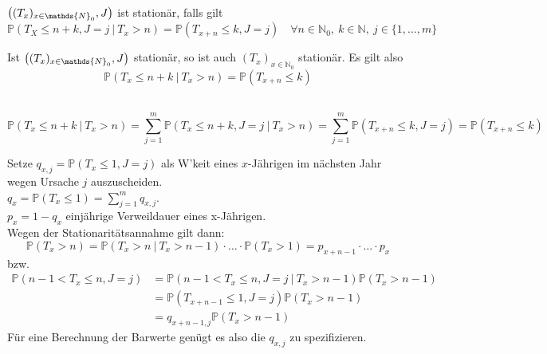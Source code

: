 $\enbrace{(T_x)_{x\in \mathds{N}_0},J}$ ist stationär, falls gilt 
\[ 
\mathds{P}(T_X\le n+k,J=j~|~T_x>n)=\mathds{P}(T_{x+n}\le k,J=j)\quad \forall n\in \mathds{N}_0,~k\in \mathds{N},~j\in \{1,\dots,m\} 
\]

Ist $\enbrace{(T_x)_{x\in \mathds{N}_0},J}$ stationär, so ist auch $(T_x)_{x\in \mathds{N}_0}$ stationär. Es gilt also 
\[ 
\mathds{P}(T_x\le n+k~|~T_x>n)=\mathds{P}(T_{x+n}\le k) 
\]

\\
\[ 
\mathds{P}(T_x\le n+k~|~T_x>n)= \sum_{j=1}^{m}\mathds{P}(T_x\le n+k,J=j~|~T_x>n)= \sum_{j=1}^{m}\mathds{P}(T_{x+n}\le k,J=j)= \mathds{P}(T_{x+n}\le k) 
\]

Setze $q_{x,j}=\mathds{P}(T_x\le 1,J=j)$ als W'keit eines $x$-Jährigen im nächsten Jahr wegen Ursache $j$ auszuscheiden.\\
$q_x=\mathds{P}(T_x\le 1)=\sum_{j=1}^{m}q_{x,j}$.\\
$p_x=1-q_x$ einjährige Verweildauer eines x-Jährigen.\\
Wegen der Stationaritätsannahme gilt dann: \[ \mathds{P}(T_x>n)=\mathds{P}(T_x>n~|~T_x>n-1)\cdot\dots \cdot \mathds{P}(T_x>1)= p_{x+n-1}\cdot \dots\cdot p_x \]
bzw.
\begin{equation*}
\begin{aligned}
	\mathds{P}(n-1<T_x\le n,J=j) &= \mathds{P}(n-1<T_x\le n,J=j~|~T_x>n-1)\mathds{P}(T_x>n-1)\\
	&= \mathds{P}(T_{x+n-1}\le 1,J=j)\mathds{P}(T_x>n-1)\\
	&= q_{x+n-1,j}\mathds{P}(T_x>n-1)
\end{aligned}
\end{equation*}
Für eine Berechnung der Barwerte genügt es also die $q_{x,j}$ zu spezifizieren.\\

